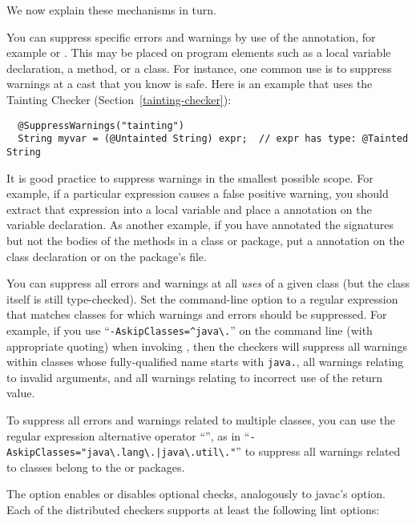 \noindent
We now explain these mechanisms in turn.

You can suppress specific errors and warnings by use of the
 annotation, for example
 or .
This may be placed on program elements such as a local
variable declaration, a method, or a class.  For instance, one common use is
to suppress warnings at a cast that you know is safe.  Here is an example
that uses the Tainting Checker (Section~\ref{tainting-checker}):

\begin{Verbatim}
  @SuppressWarnings("tainting")
  String myvar = (@Untainted String) expr;  // expr has type: @Tainted String
\end{Verbatim}

It is good practice to suppress warnings in the
smallest possible scope.  For example, if a particular expression causes a
false positive warning, you should extract that expression into a local variable
and place a  annotation on the variable
declaration.
As another example, if you have annotated the signatures but not the bodies
of the methods in a class or package, put a 
annotation on the class declaration or on the package's
 file.

You can suppress all errors and warnings at all \emph{uses} of a given
class (but the class itself is still type-checked).
Set the  command-line option to a
regular expression that matches classes for which warnings and errors
should be suppressed.  For example, if you use
``{\codesize\verb|-AskipClasses=^java\.|}'' on the command line
(with appropriate quoting) when invoking
, then the checkers will suppress all warnings within
classes whose fully-qualified name starts with \codesize\verb|java.|, all
warnings relating to invalid arguments, and all warnings relating to incorrect
use of the return value.

To suppress all errors and warnings related to multiple classes, you can use
the regular expression alternative operator ``\code{|}'', as in
``{\codesize\verb+-AskipClasses="java\.lang\.|java\.util\."+}'' to suppress
all warnings related to classes belong to the  or
 packages.

\label{lint-options}

The  option enables or disables optional checks, analogously to
javac's  option.
Each of the distributed checkers supports at least the following lint options:

